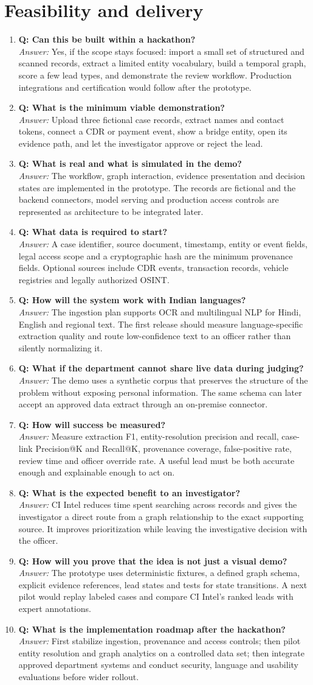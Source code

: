 \documentclass[10pt,a4paper]{article}
\newcommand{\qa}[2]{\item \textbf{\color{navy}Q: #1}\\[-1pt]{\color{coral}\textit{Answer:}} #2}
\begin{document}
\section{Feasibility and delivery}
\begin{enumerate}[resume]
\qa{Can this be built within a hackathon?}{Yes, if the scope stays focused: import a small set of structured and scanned records, extract a limited entity vocabulary, build a temporal graph, score a few lead types, and demonstrate the review workflow. Production integrations and certification would follow after the prototype.}
\qa{What is the minimum viable demonstration?}{Upload three fictional case records, extract names and contact tokens, connect a CDR or payment event, show a bridge entity, open its evidence path, and let the investigator approve or reject the lead.}
\qa{What is real and what is simulated in the demo?}{The workflow, graph interaction, evidence presentation and decision states are implemented in the prototype. The records are fictional and the backend connectors, model serving and production access controls are represented as architecture to be integrated later.}
\qa{What data is required to start?}{A case identifier, source document, timestamp, entity or event fields, legal access scope and a cryptographic hash are the minimum provenance fields. Optional sources include CDR events, transaction records, vehicle registries and legally authorized OSINT.}
\qa{How will the system work with Indian languages?}{The ingestion plan supports OCR and multilingual NLP for Hindi, English and regional text. The first release should measure language-specific extraction quality and route low-confidence text to an officer rather than silently normalizing it.}
\qa{What if the department cannot share live data during judging?}{The demo uses a synthetic corpus that preserves the structure of the problem without exposing personal information. The same schema can later accept an approved data extract through an on-premise connector.}
\qa{How will success be measured?}{Measure extraction F1, entity-resolution precision and recall, case-link Precision@K and Recall@K, provenance coverage, false-positive rate, review time and officer override rate. A useful lead must be both accurate enough and explainable enough to act on.}
\qa{What is the expected benefit to an investigator?}{CI Intel reduces time spent searching across records and gives the investigator a direct route from a graph relationship to the exact supporting source. It improves prioritization while leaving the investigative decision with the officer.}
\qa{How will you prove that the idea is not just a visual demo?}{The prototype uses deterministic fixtures, a defined graph schema, explicit evidence references, lead states and tests for state transitions. A next pilot would replay labeled cases and compare CI Intel's ranked leads with expert annotations.}
\qa{What is the implementation roadmap after the hackathon?}{First stabilize ingestion, provenance and access controls; then pilot entity resolution and graph analytics on a controlled data set; then integrate approved department systems and conduct security, language and usability evaluations before wider rollout.}
\end{enumerate}
\end{document}
